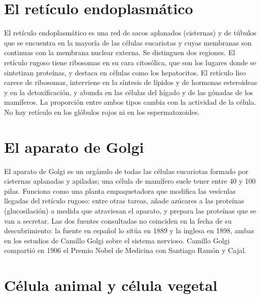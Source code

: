 \documentclass{book}
\begin{document}

\section{El retículo endoplasmático}

El retículo endoplasmático es una red de sacos aplanados (cisternas) y de túbulos que se encuentra en la mayoría de las células eucariotas y cuyas membranas son continuas con la membrana nuclear externa. Se distinguen dos regiones. El retículo rugoso tiene ribosomas en su cara citosólica, que son los lugares donde se sintetizan proteínas, y destaca en células como los hepatocitos. El retículo liso carece de ribosomas, interviene en la síntesis de lípidos y de hormonas esteroideas y en la detoxificación, y abunda en las células del hígado y de las gónadas de los mamíferos. La proporción entre ambos tipos cambia con la actividad de la célula. No hay retículo en los glóbulos rojos ni en los espermatozoides.


\section{El aparato de Golgi}

El aparato de Golgi es un orgánulo de todas las células eucariotas formado por cisternas aplanadas y apiladas; una célula de mamífero suele tener entre 40 y 100 pilas. Funciona como una planta empaquetadora que modifica las vesículas llegadas del retículo rugoso: entre otras tareas, añade azúcares a las proteínas (glucosilación) a medida que atraviesan el aparato, y prepara las proteínas que se van a secretar. Las dos fuentes consultadas no coinciden en la fecha de su descubrimiento: la fuente en español lo sitúa en 1889 y la inglesa en 1898, ambas en los estudios de Camillo Golgi sobre el sistema nervioso. Camillo Golgi compartió en 1906 el Premio Nobel de Medicina con Santiago Ramón y Cajal.


\section{Célula animal y célula vegetal}
\end{document}
